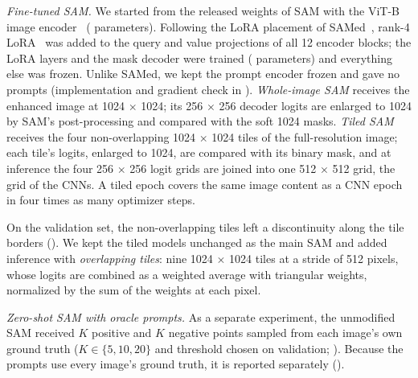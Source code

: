 

\emph{Fine-tuned SAM.} We started from the released weights of SAM with the ViT-B image
encoder~\cite{kirillov2023sam,dosovitskiy2021vit} (\OracleParams{} parameters). Following the LoRA placement of SAMed~\cite{zhang2023samed}, rank-4 LoRA~\cite{hu2022lora} was added to the query and value projections of all 12 encoder blocks; the LoRA layers and the
mask decoder were trained (\SAMTiledParamsTrainable{} parameters) and everything else was frozen. Unlike SAMed, we kept the
prompt encoder frozen and gave no prompts (implementation and gradient
check in ). \emph{Whole-image SAM} receives the enhanced image at 1024 $\times$ 1024; its 256 $\times$ 256
decoder logits are enlarged to 1024 by SAM's post-processing and compared with the soft 1024 masks. \emph{Tiled SAM}
receives the four non-overlapping 1024 $\times$ 1024 tiles of the full-resolution image; each tile's logits, enlarged to
1024, are compared with its binary mask, and at inference the four 256 $\times$ 256 logit grids are joined into one
512 $\times$ 512 grid, the grid of the CNNs. A tiled epoch covers the same image content as a CNN epoch in four times as
many optimizer steps.

On the validation set, the non-overlapping tiles left a discontinuity along the tile borders (). We kept
the tiled models unchanged as the main SAM and added inference with \emph{overlapping tiles}: nine 1024 $\times$ 1024
tiles at a stride of 512 pixels, whose logits are combined as a weighted average with triangular weights, normalized by
the sum of the weights at each pixel.

\emph{Zero-shot SAM with oracle prompts.} As a separate experiment, the unmodified SAM received $K$ positive and $K$
negative points sampled from each image's own ground truth ($K \in \{5, 10, 20\}$ and threshold chosen on validation;
). Because the prompts use every image's ground truth, it is reported separately
().

